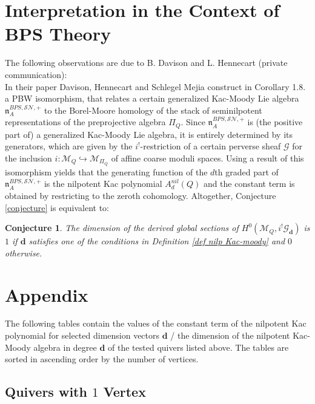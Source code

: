 \documentclass{article}
\newcommand{\bd}{\mathbf{d}}
\newtheorem{conjecture}[theorem]{Conjecture}
\begin{document}
\section{Interpretation in the Context of BPS Theory}
The following observations are due to B. Davison and L. Hennecart (private communication):\\
In their paper \cite{BPS} Davison, Hennecart and Schlegel Mejia construct in Corollary 1.8. a PBW isomorphism, that relates a certain generalized Kac-Moody Lie algebra $\mathfrak{n}^{BPS, \mathcal{SN},+}_A$ to the Borel-Moore homology of the stack of seminilpotent representations of the preprojective algebra $\Pi_Q$. Since $\mathfrak{n}^{BPS, \mathcal{SN},+}_A$ is (the positive part of) a generalized Kac-Moody Lie algebra, it is entirely determined by its generators, which are given by the $i^!$-restriction of a certain perverse sheaf $\mathcal{G}$ for the inclusion $i:\mathcal{M}_Q \hookrightarrow \mathcal{M}_{\Pi_Q}$ of affine coarse moduli spaces. Using a result of \cite{pointsnilpotentvarities} this isomorphism yields that the generating function of the $d$th graded part of $\mathfrak{n}^{BPS, \mathcal{SN},+}_A$ is the nilpotent Kac polynomial $A_d^{nil}(Q)$ and the constant term is obtained by restricting to the zeroth cohomology. Altogether, Conjecture \ref{conjecture} is equivalent to:

\begin{conjecture}
    The dimension of the derived global sections of $H^0(\mathcal{M}_Q, i^!\mathcal{G}_{\bd})$ is $1$ if $\bd$ satisfies one of the conditions in Definition \ref{def nilp Kac-moody} and $0$ otherwise.
\end{conjecture}



\section{Appendix}
The following tables contain the values of the constant term of the nilpotent Kac polynomial for selected dimension vectors $\bd$ / the dimension of the nilpotent Kac-Moody algebra in degree $\bd$ of the tested quivers listed above. The tables are sorted in ascending order by the number of vertices.
\subsection*{Quivers with $1$ Vertex}
\end{document}
